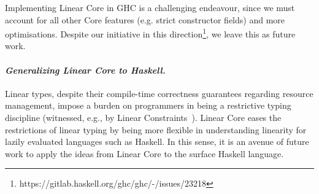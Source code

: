 \documentclass[acmsmall, screen, review]{acmart}
\newcommand{\parawith}[1]{\paragraph{\emph{#1}}}
\begin{document}
Implementing Linear Core in GHC is a challenging endeavour, since we must account
for all other Core features (e.g. strict constructor fields) and more
optimisations. Despite our initiative in this
direction\footnote{https://gitlab.haskell.org/ghc/ghc/-/issues/23218}, we leave
this as future work.

\parawith{Generalizing Linear Core to Haskell.}
Linear types, despite their compile-time correctness guarantees regarding
resource management, impose a burden on programmers in being a restrictive
typing discipline (witnessed, e.g., by Linear
Constraints~\cite{cite:linearconstraints}). Linear Core eases the restrictions
of linear typing by being more flexible in understanding linearity for lazily
evaluated languages such as Haskell. In this sense, it is an avenue of future
work to apply the ideas from Linear Core to the surface Haskell language.

% 
% 
% 
% 
% 
% 
% 
% 
% 
\end{document}
